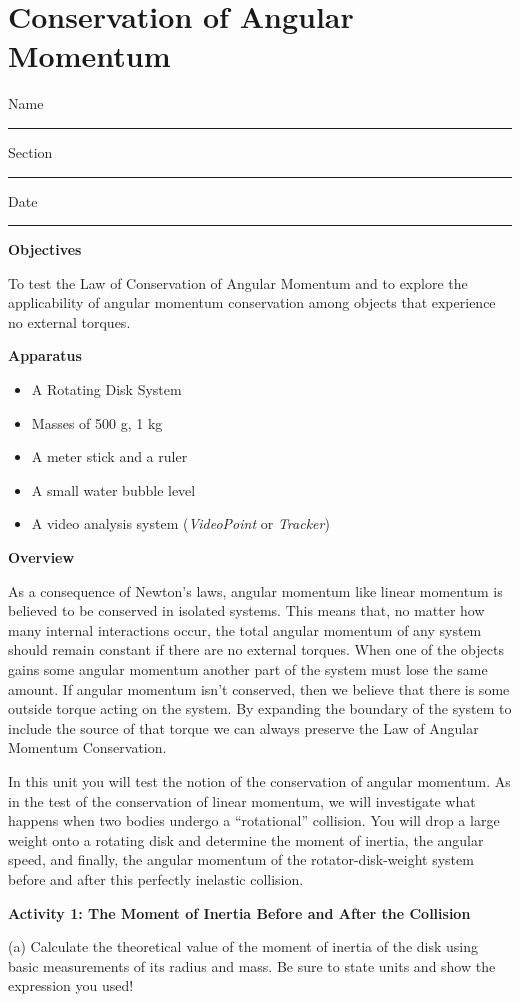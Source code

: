 
\section{Conservation of Angular Momentum}

Name \rule{2.0in}{0.1pt}\hfill{}Section \rule{1.0in}{0.1pt}\hfill{}Date \rule{1.0in}{0.1pt}

\textbf{Objectives} 

To test the Law of Conservation of Angular Momentum and to explore the applicability
of angular momentum conservation among objects that experience no external torques. 

\textbf{Apparatus}

\begin{itemize}
\item A Rotating Disk System 
\item Masses of 500 g, 1 kg 
\item A meter stick and a ruler 
\item A small water bubble level
\item A video analysis system (\textit{VideoPoint} or \textit{Tracker})
\end{itemize}
\textbf{Overview }

As a consequence of Newton's laws, angular momentum like linear momentum is
believed to be conserved in isolated systems. This means that, no matter how
many internal interactions occur, the total angular momentum of any system should remain constant if there are no external torques. When one of the objects gains some angular momentum another part of the system must lose the same amount. If angular momentum isn't conserved, then we believe that there is some outside torque acting on the system. By expanding the boundary of the system to include the source of that torque we can always preserve the Law of Angular Momentum Conservation. 

In this unit you will test the notion of the conservation of angular momentum.
As in the test of the conservation of linear momentum, we will investigate what
happens when two bodies undergo a ``rotational'' collision.
You will drop a large weight onto a rotating disk and determine the moment of
inertia, the angular speed, and finally, the angular momentum of the rotator-disk-weight
system before and after this perfectly inelastic collision.

\textbf{Activity 1: The Moment of Inertia Before and After the Collision}

(a) Calculate the theoretical value of the moment of inertia of the disk
using basic measurements of its radius and mass. Be sure to state units and
show the expression you used!
\vspace{5mm}

